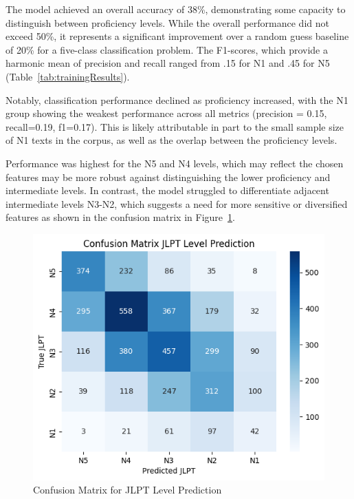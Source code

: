 The model achieved an overall accuracy of 38\%, demonstrating some capacity to distinguish between proficiency
levels.
While the overall performance did not exceed 50\%, it represents a significant improvement over a random guess
baseline of 20\% for a five-class classification problem. The F1-scores, which provide a harmonic mean of precision
and recall ranged from .15 for N1 and .45 for N5 (Table~\ref{tab:trainingResults}).

Notably, classification performance declined as proficiency increased, with the N1 group showing the weakest
performance across all metrics (precision = 0.15, recall=0.19, f1=0.17). This is likely attributable in part to the
small sample size of N1 texts in the corpus, as well as the overlap between the proficiency levels.

Performance was highest for the N5 and N4 levels, which may reflect the chosen features may be more robust against
distinguishing the lower proficiency and intermediate levels. In contrast, the model struggled to differentiate
adjacent intermediate levels N3-N2, which suggests a need for more sensitive or diversified features as shown in the
confusion matrix in Figure~\ref{fig:conMA}.

\begin{figure}[h!]
           \centering
           \includegraphics[scale=.4]{img/confusionMatrix}
           \caption[Confusion Matrix for JLPT Level Prediction]{Confusion Matrix for JLPT Level Prediction}
           \label{fig:conMA}
\end{figure}

